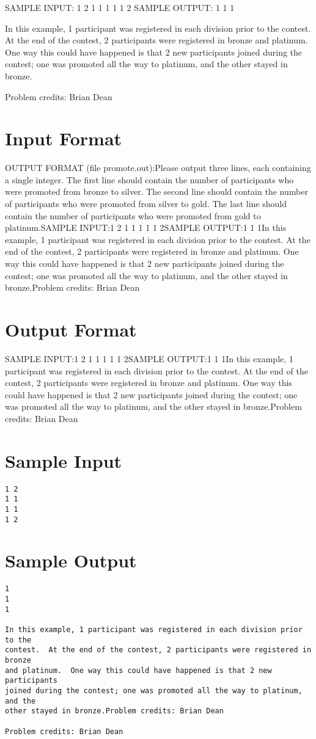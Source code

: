 \documentclass[12pt]{article}
\begin{document}
SAMPLE INPUT:
1 2
1 1
1 1
1 2
SAMPLE OUTPUT: 
1
1
1

In this example, 1 participant was registered in each division prior to the
contest.  At the end of the contest, 2 participants were registered in bronze
and platinum.  One way this could have happened is that 2 new participants
joined during the contest; one was promoted all the way to platinum, and the
other stayed in bronze.

Problem credits: Brian Dean




\section*{Input Format}
OUTPUT FORMAT (file promote.out):Please output three lines, each containing a single integer. The first line
should contain the number of participants who were promoted from bronze to
silver. The second line should contain the number of participants who were
promoted from silver to gold. The last line should contain the number of
participants who were promoted from gold to platinum.SAMPLE INPUT:1 2
1 1
1 1
1 2SAMPLE OUTPUT:1
1
1In this example, 1 participant was registered in each division prior to the
contest.  At the end of the contest, 2 participants were registered in bronze
and platinum.  One way this could have happened is that 2 new participants
joined during the contest; one was promoted all the way to platinum, and the
other stayed in bronze.Problem credits: Brian Dean

\section*{Output Format}
SAMPLE INPUT:1 2
1 1
1 1
1 2SAMPLE OUTPUT:1
1
1In this example, 1 participant was registered in each division prior to the
contest.  At the end of the contest, 2 participants were registered in bronze
and platinum.  One way this could have happened is that 2 new participants
joined during the contest; one was promoted all the way to platinum, and the
other stayed in bronze.Problem credits: Brian Dean

\section*{Sample Input}
\begin{verbatim}
1 2
1 1
1 1
1 2
\end{verbatim}

\section*{Sample Output}
\begin{verbatim}
1
1
1

In this example, 1 participant was registered in each division prior to the
contest.  At the end of the contest, 2 participants were registered in bronze
and platinum.  One way this could have happened is that 2 new participants
joined during the contest; one was promoted all the way to platinum, and the
other stayed in bronze.Problem credits: Brian Dean

Problem credits: Brian Dean
\end{verbatim}
\end{document}

